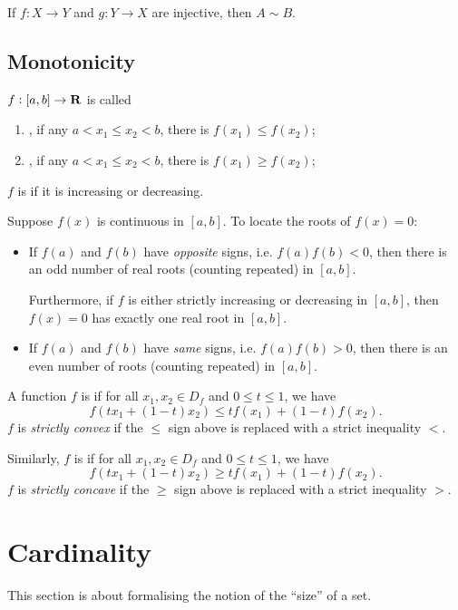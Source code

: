 \begin{theorem}
If $f:X\to Y$ and $g:Y\to X$ are injective, then $A\sim B$.
\end{theorem}

\subsection{Monotonicity}
\begin{definition}[Monotonicity]
$f:[a,b]\to\mathbf R$ is called
\begin{enumerate}[label=(\roman*)]
\item {}, if any $a<x_1\le x_2<b$, there is $f(x_1)\le f(x_2)$;
\item {}, if any $a<x_1\le x_2<b$, there is $f(x_1)\ge f(x_2)$;
\end{enumerate}
$f$ is  if it is increasing or decreasing.
\end{definition}

Suppose $f(x)$ is continuous in $[a,b]$. To locate the roots of $f(x)=0$:
\begin{itemize}
\item If $f(a)$ and $f(b)$ have \emph{opposite} signs, i.e. $f(a)f(b)<0$, then there is an odd number of real roots (counting repeated) in $[a,b]$.

Furthermore, if $f$ is either strictly increasing or decreasing in $[a,b]$, then $f(x)=0$ has exactly one real root in $[a,b]$.

\item If $f(a)$ and $f(b)$ have \emph{same} signs, i.e. $f(a)f(b)>0$, then there is an even number of roots (counting repeated) in $[a,b]$.
\end{itemize}

\begin{definition}[Convexity]
A function $f$ is  if for all $x_1,x_2\in D_f$ and $0\le t\le 1$, we have
\[ f(tx_1+(1-t)x_2)\le tf(x_1)+(1-t)f(x_2).\]
$f$ is \emph{strictly convex} if the $\le$ sign above is replaced with a strict inequality $<$.

Similarly, $f$ is  if for all $x_1,x_2\in D_f$ and $0\le t\le 1$, we have
\[ f(tx_1+(1-t)x_2)\ge tf(x_1)+(1-t)f(x_2). \]
$f$ is \emph{strictly concave} if the $\ge$ sign above is replaced with a strict inequality $>$.
\end{definition}
\pagebreak

\section{Cardinality}
This section is about formalising the notion of the ``size'' of a set.

